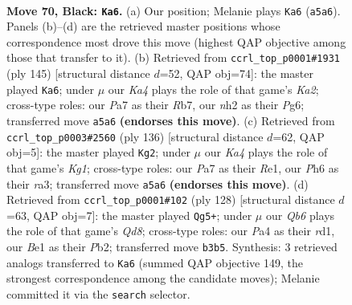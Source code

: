 \documentclass[11pt]{article}
\begin{document}
\clearpage

\begin{figure}[p]\centering
\begin{subfigure}{0.46\textwidth}\centering
\resizebox{\linewidth}{!}{%
\newchessgame
\chessboard[
  setfen={5r1r/p5p1/7p/k1Qp3P/p2P2P1/1q2P3/7N/4b2K b - - 49 70},
  showmover=false,
  pgfstyle=straightmove, color=movearrow, markmove={a5-a6}
]}
\caption{}
\end{subfigure}\hfill
\begin{subfigure}{0.46\textwidth}\centering
\resizebox{\linewidth}{!}{%
\newchessgame
\chessboard[
  setfen={8/kr3p2/4p1p1/p1QpP3/P4P2/1b2P1K1/8/8 b - - 20 73},
  showmover=false,
  pgfstyle=straightmove, color=movearrow, markmove={a7-a6}
]}
\caption{}
\end{subfigure}
\\[4pt]
\begin{subfigure}{0.46\textwidth}\centering
\resizebox{\linewidth}{!}{%
\newchessgame
\chessboard[
  setfen={6k1/p5p1/1pp1p2p/4Pq1P/1P3P1Q/r5B1/8/4R1K1 w - - 0 69},
  showmover=false,
  pgfstyle=straightmove, color=movearrow, markmove={g1-g2}
]}
\caption{}
\end{subfigure}\hfill
\begin{subfigure}{0.46\textwidth}\centering
\resizebox{\linewidth}{!}{%
\newchessgame
\chessboard[
  setfen={3Q4/5pk1/3p4/2qPp3/8/P4PP1/1P3RK1/3r4 w - - 15 65},
  showmover=false,
  pgfstyle=straightmove, color=movearrow, markmove={d8-g5}
]}
\caption{}
\end{subfigure}
\caption{\textbf{Move 70, Black: \texttt{Ka6}.} (a) Our position; Melanie plays \texttt{Ka6} (\texttt{a5a6}). Panels (b)--(d) are the retrieved master positions whose correspondence most drove this move (highest QAP objective among those that transfer to it). (b) Retrieved from \texttt{ccrl\_top\_p0001\#1931} (ply 145) [structural distance $d$=52, QAP obj=74]: the master played \texttt{Ka6}; under $\mu$ our \emph{Ka4} plays the role of that game's \emph{Ka2}; cross-type roles: our \emph{P}a7 as their \emph{R}b7, our \emph{n}h2 as their \emph{P}g6; transferred move \texttt{a5a6} \textbf{(endorses this move)}. (c) Retrieved from \texttt{ccrl\_top\_p0003\#2560} (ply 136) [structural distance $d$=62, QAP obj=5]: the master played \texttt{Kg2}; under $\mu$ our \emph{Ka4} plays the role of that game's \emph{Kg1}; cross-type roles: our \emph{P}a7 as their \emph{R}e1, our \emph{P}h6 as their \emph{r}a3; transferred move \texttt{a5a6} \textbf{(endorses this move)}. (d) Retrieved from \texttt{ccrl\_top\_p0001\#102} (ply 128) [structural distance $d$=63, QAP obj=7]: the master played \texttt{Qg5+}; under $\mu$ our \emph{Qb6} plays the role of that game's \emph{Qd8}; cross-type roles: our \emph{P}a4 as their \emph{r}d1, our \emph{B}e1 as their \emph{P}b2; transferred move \texttt{b3b5}. Synthesis: 3 retrieved analogs transferred to \texttt{Ka6} (summed QAP objective 149, the strongest correspondence among the candidate moves); Melanie committed it via the \texttt{search} selector.}
\label{fig:thought-m139}
\end{figure}
\end{document}

